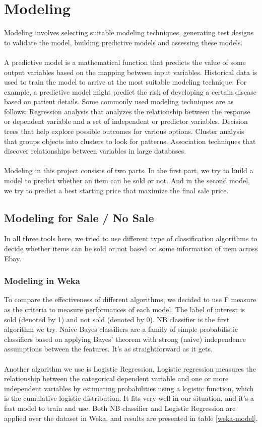 \documentclass[CEJM,PDF]{cej} %
\begin{document}
\section{Modeling}

Modeling involves selecting suitable modeling techniques, generating test designs to validate the model, building predictive models and assessing these models.\\
\\
A predictive model is a mathematical function that predicts the value of some output variables based on the mapping between input variables. Historical data is used to train the model to arrive at the most suitable modeling technique. For example, a predictive model might predict the risk of developing a certain disease based on patient details. Some commonly used modeling techniques are as follows: Regression analysis that analyzes the relationship between the response or dependent variable and a set of independent or predictor variables. Decision trees that help explore possible outcomes for various options. Cluster analysis that groups objects into clusters to look for patterns. Association techniques that discover relationships between variables in large databases.\\
\\
Modeling in this project consists of two parts. In the first part, we try to build a model to predict whether an item can be sold or not. And in the second model, we try to predict a best starting price that maximize the final sale price.\\

\subsection{Modeling for Sale / No Sale}
In all three tools here, we tried to use different type of classification algorithms to decide whether items can be sold or not based on some information of item across Ebay.
\\
\subsubsection{Modeling in Weka}
To compare the effectiveness of different algorithms, we decided to use F measure as the criteria to measure performances of each model. The label of interest is sold (denoted by 1) and not sold (denoted by 0). NB classifier is the first algorithm we try. Naive Bayes classifiers are a family of simple probabilistic classifiers based on applying Bayes' theorem with strong (naive) independence assumptions between the features. It's as straightforward as it gets. \\
\\
Another algorithm we use is Logistic Regression, Logistic regression measures the relationship between the categorical dependent variable and one or more independent variables by estimating probabilities using a logistic function, which is the cumulative logistic distribution. It fits very well in our situation, and it's a fast model to train and use. Both NB classifier and Logistic Regression are applied over the dataset in Weka, and results are presented in table \ref{weka-model}.\\
\end{document}
